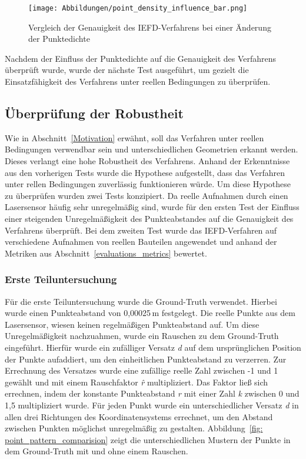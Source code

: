 \begin{figure}[t]
	\texttt{[image: Abbildungen/point\_density\_influence\_bar.png]}
	\centering
	\caption[Einfluss der Punktedichte auf die Genauigkeit]{Vergleich der Genauigkeit des IEFD-Verfahrens bei einer Änderung der Punktedichte}
	\label{fig: point_density_bar_chart}
\end{figure}

Nachdem der Einfluss der Punktedichte auf die Genauigkeit des Verfahrens überprüft wurde, wurde der nächste Test ausgeführt, um gezielt die Einsatzfähigkeit des Verfahrens unter reellen Bedingungen zu überprüfen.

\subsection{Überprüfung der Robustheit} \label{test_3}
Wie in Abschnitt~\ref{Motivation} erwähnt, soll das Verfahren unter reellen Bedingungen verwendbar sein und unterschiedlichen Geometrien erkannt werden. Dieses verlangt eine hohe Robustheit des Verfahrens. Anhand der Erkenntnisse aus den vorherigen Tests wurde die Hypothese aufgestellt, dass das Verfahren unter rellen Bedingungen zuverlässig funktionieren würde. Um diese Hypothese zu überprüfen wurden zwei Tests konzipiert. Da reelle Aufnahmen durch einen Lasersensor häufig sehr unregelmäßig sind, wurde für den ersten Test der Einfluss einer steigenden Unregelmäßigkeit des Punkteabstandes auf die Genauigkeit des Verfahrens überprüft. Bei dem zweiten Test wurde das IEFD-Verfahren auf verschiedene Aufnahmen von reellen Bauteilen angewendet und anhand der Metriken aus Abschnitt~\ref{evaluations_metrics} bewertet.

\subsubsection{Erste Teiluntersuchung} \label{test_3_part_1}
Für die erste Teiluntersuchung wurde die Ground-Truth verwendet. Hierbei wurde einen Punkteabstand von 0,00025\,\si{\m} festgelegt. Die reelle Punkte aus dem Lasersensor, wiesen keinen regelmäßigen Punkteabstand auf. Um diese Unregelmäßigkeit nachzuahmen, wurde ein Rauschen zu dem Ground-Truth eingeführt. Hierfür wurde ein zufälliger Versatz \textit{d} auf dem ursprünglichen Position der Punkte aufaddiert, um den einheitlichen Punkteabstand zu verzerren. Zur Errechnung des Versatzes wurde eine zufällige reelle Zahl zwischen -1 und 1 gewählt und mit einem Rauschfaktor \textit{\^{r}} multipliziert. Das Faktor ließ sich errechnen, indem der konstante Punkteabstand \textit{r} mit einer Zahl \textit{k} zwischen 0 und 1,5 multipliziert wurde. Für jeden Punkt wurde ein unterschiedlicher Versatz \textit{d} in allen drei Richtungen des Koordinatensystems errechnet, um den Abstand zwischen Punkten möglichst unregelmäßig zu gestalten. Abbildung~\ref{fig: point_pattern_comparision} zeigt die unterschiedlichen Mustern der Punkte in dem Ground-Truth mit und ohne einem Rauschen. 

